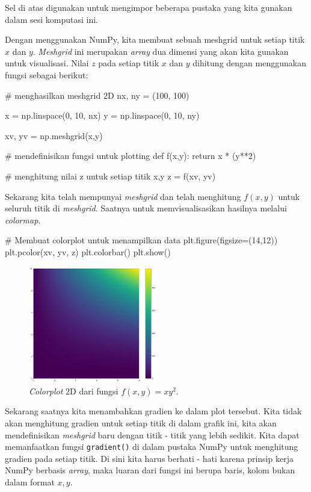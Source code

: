 Sel di atas digunakan untuk mengimpor beberapa pustaka yang kita gunakan dalam sesi komputasi ini. 

Dengan menggunakan NumPy, kita membuat sebuah meshgrid untuk setiap titik $x$ dan $y$. \textit{Meshgrid} ini merupakan \textit{array} dua dimensi yang akan kita gunakan untuk visualisasi. Nilai $z$ pada setiap titik $x$ dan $y$ dihitung dengan menggunakan fungsi sebagai berikut:

\begin{pyin}
# menghasilkan meshgrid 2D
nx, ny = (100, 100)

x = np.linspace(0, 10, nx)
y = np.linspace(0, 10, ny)

xv, yv = np.meshgrid(x,y)

# mendefinisikan fungsi untuk plotting
def f(x,y):
    return x * (y**2)

# menghitung nilai z untuk setiap titik x,y
z = f(xv, yv)
\end{pyin}

Sekarang kita telah mempunyai \textit{meshgrid} dan telah menghitung $f(x,y)$ untuk seluruh titik di \textit{meshgrid}. Saatnya untuk memvisualisasikan hasilnya melalui \textit{colormap}.

\begin{pyin}
# Membuat colorplot untuk menampilkan data 
plt.figure(figsize=(14,12))
plt.pcolor(xv, yv, z)
plt.colorbar()
plt.show()
\end{pyin}

\begin{figure}[H]
    \centering
    \includegraphics[width=0.5\textwidth]{gambar/gmb6.png}
    \caption{\textit{Colorplot} 2D dari fungsi $f(x,y)=xy^2$.}
    \label{fig:fig6}
\end{figure}

Sekarang saatnya kita menambahkan gradien ke dalam plot tersebut. Kita tidak akan menghitung gradien untuk setiap titik di dalam grafik ini, kita akan mendefinisikan \textit{meshgrid} baru dengan titik - titik yang lebih sedikit. Kita dapat memanfaatkan fungsi \verb|gradient()| di dalam pustaka NumPy untuk menghitung gradien pada setiap titik. Di sini kita harus berhati - hati karena prinsip kerja NumPy berbasis \textit{array}, maka luaran dari fungsi ini berupa baris, kolom bukan dalam format $x,y$.

